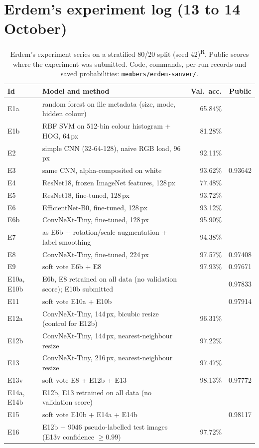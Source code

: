 \documentclass[11pt,a4paper]{article}
\newcommand{\rep}{\textsuperscript{\textcolor{reported}{\sffamily\scriptsize R}}}
\begin{document}
\section{Erdem's experiment log (13 to 14 October)}
\label{app:log}
\begin{table}[H]
\centering\small
\caption{Erdem's experiment series on a stratified 80/20 split (seed 42)\rep. Public scores where the experiment was submitted. Code, commands, per-run records and saved probabilities: \texttt{members/erdem-sanver/}.}
\begin{tabularx}{\textwidth}{@{}l>{\raggedright\arraybackslash}Xrr@{}}
\toprule
Id & Model and method & Val.\ acc. & Public\\
\midrule
E1a & random forest on file metadata (size, mode, hidden colour) & 65.84\% & \\
E1b & RBF SVM on 512-bin colour histogram + HOG, 64\,px & 81.28\% & \\
E2 & simple CNN (32-64-128), naive RGB load, 96\,px & 92.11\% & \\
E3 & same CNN, alpha-composited on white & 93.62\% & 0.93642\\
E4 & ResNet18, frozen ImageNet features, 128\,px & 77.48\% & \\
E5 & ResNet18, fine-tuned, 128\,px & 93.72\% & \\
E6 & EfficientNet-B0, fine-tuned, 128\,px & 93.12\% & \\
E6b & ConvNeXt-Tiny, fine-tuned, 128\,px & 95.90\% & \\
E7 & as E6b + rotation/scale augmentation + label smoothing & 94.38\% & \\
E8 & ConvNeXt-Tiny, fine-tuned, 224\,px & 97.57\% & 0.97408\\
E9 & soft vote E6b + E8 & 97.93\% & 0.97671\\
E10a, E10b & E6b, E8 retrained on all data (no validation score); E10b submitted & & 0.97833\\
E11 & soft vote E10a + E10b & & 0.97914\\
E12a & ConvNeXt-Tiny, 144\,px, bicubic resize (control for E12b) & 96.31\% & \\
E12b & ConvNeXt-Tiny, 144\,px, nearest-neighbour resize & 97.22\% & \\
E13 & ConvNeXt-Tiny, 216\,px, nearest-neighbour resize & 97.47\% & \\
E13v & soft vote E8 + E12b + E13 & 98.13\% & 0.97772\\
E14a, E14b & E12b, E13 retrained on all data (no validation score) & & \\
E15 & soft vote E10b + E14a + E14b & & 0.98117\\
E16 & E12b + \num{9046} pseudo-labelled test images (E13v confidence $\geq 0.99$) & 97.72\% & \\
\bottomrule
\end{tabularx}
\end{table}
\end{document}

